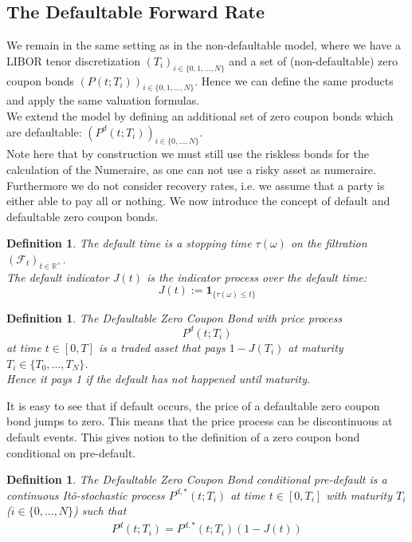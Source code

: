 \documentclass[12pt]{article}
\newtheorem{definition}[theorem]{Definition}
\begin{document}
	\subsection{The Defaultable Forward Rate}
		We remain in the same setting as in the non-defaultable model, where we have a LIBOR tenor discretization \((T_i)_{i\in\{0, 1, ..., N\}}\) and a set of (non-defaultable) zero coupon bonds \((P(t;T_i))_{i\in\{0, 1, ..., N\}}\). Hence we can define the same products and apply the same valuation formulas.\\
		We extend the model by defining an additional set of zero coupon bonds which are defaultable: \((P^d(t;T_i))_{i\in\{0, ..., N\}}\).\\
		Note here that by construction we must still use the riskless bonds for the calculation of the Numeraire, as one can not use a risky asset as numeraire.
		Furthermore we do not consider recovery rates, i.e. we assume that a party is either able to pay all or nothing.
		We now introduce the concept of default and defaultable zero coupon bonds.
	\begin{definition}
		The \emph{default time} is a stopping time \(\tau(\omega)\) on the filtration \((\mathcal{F}_t)_{t\in \mathbb{R}^+}\).\\
		The \emph{default indicator} \(J(t)\) is the indicator process over the default time:
		\[J(t) := \mathbf{1}_{\{\tau(\omega) \le t\}}\]
	\end{definition}
	\begin{definition}
		The \emph{Defaultable Zero Coupon Bond} with price process \[P^d(t; T_i)\] at time \(t \in \left[0, T\right]\) is a traded asset that pays \(1 - J(T_i)\) at maturity  \(T_i \in \{T_0, ..., T_N\}\).\\
		Hence it pays 1 if the default has not happened until maturity. 
	\end{definition}
	It is easy to see that if default occurs, the price of a defaultable zero coupon bond jumps to zero. This means that the price process can be discontinuous at default events. This gives notion to the definition of a zero coupon bond conditional on pre-default.
	\begin{definition}
		The \emph{Defaultable Zero Coupon Bond conditional pre-default} is a continuous Itô-stochastic process \(P^{d,*}(t; T_i)\) at time \(t \in \left[0, T_i\right]\) with maturity $T_i$ ($i \in \{0, ..., N\}$) such that
		\begin{align*}
			P^{d}(t; T_i) = P^{d,*}(t; T_i)(1 - J(t))
		\end{align*}
	\end{definition}
\end{document}

